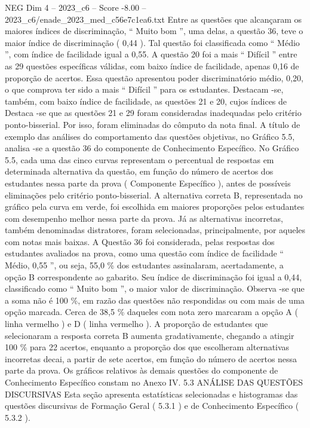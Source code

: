 \begin{textsample}{NEG Dim 4 – 2023\_c6 – Score -8.00 – 2023\_c6/enade\_2023\_med\_c56e7c1ea6.txt}
Entre as questões que alcançaram os maiores índices de discriminação, “ Muito bom ”, uma delas, a questão 36, teve o maior índice de discriminação ( 0,44 ).
Tal questão foi classificada como “ Médio ”, com índice de facilidade igual a 0,55.
A questão 20 foi a mais “ Difícil ” entre as 29 questões específicas válidas, com baixo índice de facilidade, apenas 0,16 de proporção de acertos.
Essa questão apresentou poder discriminatório médio, 0,20, o que comprova ter sido a mais “ Difícil ” para os estudantes.
Destacam -se, também, com baixo índice de facilidade, as questões 21 e 20, cujos índices de Destaca -se que as questões 21 e 29 foram consideradas inadequadas pelo critério ponto-bisserial.
Por isso, foram eliminadas do cômputo da nota final.
A título de exemplo das análises do comportamento das questões objetivas, no Gráfico 5.5, analisa -se a questão 36 do componente de Conhecimento Específico.
No Gráfico 5.5, cada uma das cinco curvas representam o percentual de respostas em determinada alternativa da questão, em função do número de acertos dos estudantes nessa parte da prova ( Componente Específico ), antes de possíveis eliminações pelo critério ponto-bisserial.
A alternativa correta B, representada no gráfico pela curva em verde, foi escolhida em maiores proporções pelos estudantes com desempenho melhor nessa parte da prova.
Já as alternativas incorretas, também denominadas distratores, foram selecionadas, principalmente, por aqueles com notas mais baixas.
A Questão 36 foi considerada, pelas respostas dos estudantes avaliados na prova, como uma questão com índice de facilidade “ Médio, 0,55 ”, ou seja, 55,0 \% dos estudantes assinalaram, acertadamente, a opção B correspondente ao gabarito.
Seu índice de discriminação foi igual a 0,44, classificado como “ Muito bom ”, o maior valor de discriminação.
Observa -se que a soma não é 100 \%, em razão das questões não respondidas ou com mais de uma opção marcada.
Cerca de 38,5 \% daqueles com nota zero marcaram a opção A ( linha vermelho ) e D ( linha vermelho ).
A proporção de estudantes que selecionaram a resposta correta B aumenta gradativamente, chegando a atingir 100 \% para 22 acertos, enquanto a proporção dos que escolheram alternativas incorretas decai, a partir de sete acertos, em função do número de acertos nessa parte da prova.
Os gráficos relativos às demais questões do componente de Conhecimento Específico constam no Anexo IV. 5.3 ANÁLISE DAS QUESTÕES DISCURSIVAS Esta seção apresenta estatísticas selecionadas e histogramas das questões discursivas de Formação Geral ( 5.3.1 ) e de Conhecimento Específico ( 5.3.2 ).

\end{textsample}

